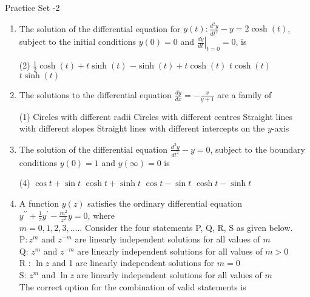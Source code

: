 \newpage
\begin{abox}
	Practice Set -2
\end{abox}
\begin{enumerate}[label=\color{ocre}\textbf{\arabic*.}]
	\item  The solution of the differential equation for $y(t): \frac{d^{2} y}{d t^{2}}-y=2 \cosh (t)$, subject to the initial conditions $y(0)=0$ and $\left.\frac{d y}{d t}\right|_{t=0}=0$, is
	{}
	\begin{tasks}(2)
		\task[\textbf{A.}] $\frac{1}{2} \cosh (t)+t \sinh (t)$
		\task[\textbf{B.}] $-\sinh (t)+t \cosh (t)$
		\task[\textbf{C.}] $t \cosh (t)$
		\task[\textbf{D.}] $t \sinh (t)$
	\end{tasks}
	\item The solutions to the differential equation $\frac{d y}{d x}=-\frac{x}{y+1}$ are a family of
	{}
	\begin{tasks}(1)
		\task[\textbf{A.}] Circles with different radii
		\task[\textbf{B.}] Circles with different centres
		\task[\textbf{C.}]  Straight lines with different slopes
		\task[\textbf{D.}]  Straight lines with different intercepts on the $y$-axis
	\end{tasks}
	\item The solution of the differential equation $\frac{d^{2} y}{d t^{2}}-y=0$, subject to the boundary conditions $y(0)=1$ and $y(\infty)=0$ is
	{}
	\begin{tasks}(4)
		\task[\textbf{A.}] $\cos t+\sin t$
		\task[\textbf{B.}] $\cosh t+\sinh t$
		\task[\textbf{C.}] $\cos t-\sin t$
		\task[\textbf{D.}]  $\cosh t-\sinh t$
	\end{tasks}
	\item  A function $y(z)$ satisfies the ordinary differential equation $y^{\prime \prime}+\frac{1}{z} y^{\prime}-\frac{m^{2}}{z^{2}} y=0$, where\\
	$m=0,1,2,3, \ldots . .$ Consider the four statements P, Q, R, S as given below.\\
	$\mathrm{P}: z^{m}$ and $z^{-m}$ are linearly independent solutions for all values of $m$\\
	Q: $z^{m}$ and $z^{-m}$ are linearly independent solutions for all values of $m>0$\\
	$\mathrm{R}$ : $\ln z$ and 1 are linearly independent solutions for $m=0$\\
	S: $z^{m}$ and $\ln z$ are linearly independent solutions for all values of $m$\\
	The correct option for the combination of valid statements is

\end{enumerate}
